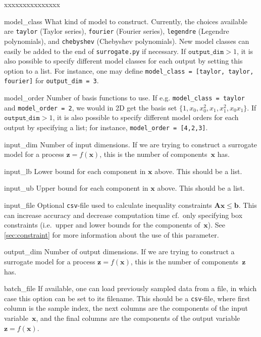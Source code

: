 \documentclass[a4paper,bibliography=numbered]{scrartcl}
\begin{document}
\begin{labeling}{xxxxxxxxxxxxxxx}
	\item[model\_class]
		What kind of model to construct.
		Currently, the choices available are \texttt{taylor} (Taylor series), \texttt{fourier} (Fourier series), \texttt{legendre} (Legendre polynomials), and \texttt{chebyshev} (Chebyshev polynomials).
		New model classes can easily be added to the end of \texttt{surrogate.py} if necessary.
		If $\texttt{output\_dim} > 1$, it is also possible to specify different model classes for each output by setting this option to a list.
		For instance, one may define \texttt{model\_class = [taylor, taylor, fourier]} for \texttt{output\_dim = 3}.
	\item[model\_order]
		Number of basis functions to use.
		If e.g. \texttt{model\_class = taylor} and \texttt{model\_order = 2},
		we would in 2D get the basis set $\{1, x_0, x_0^2, x_1, x_1^2, x_0x_1\}$.
		If $\texttt{output\_dim} > 1$, it is also possible to specify different model orders for each output by specifying a list; for instance, \texttt{model\_order = [4,2,3]}.
	\item[input\_dim]
		Number of input dimensions.
		If we are trying to construct a surrogate model for a process $\bm{z} = f(\bm{x})$, this is the number of components~$\bm{x}$ has.
	\item[input\_lb]
		Lower bound for each component in $\bm{x}$ above. This should be a list.
	\item[input\_ub]
		Upper bound for each component in $\bm{x}$ above. This should be a list.
	\item[input\_file]
		Optional \texttt{csv}-file used to calculate inequality constraints $\bm{A}\bm{x} \leq \bm{b}$.
		This can increase accuracy and decrease computation time cf.\ only specifying box constraints (i.e.\ upper and lower bounds for the components of~$\bm{x}$).
		See \cref{sec:constraint} for more information about the use of this parameter.
	\item[output\_dim]
		Number of output dimensions.
		If we are trying to construct a surrogate model for a process $\bm{z} = f(\bm{x})$, this is the number of components~$\bm{z}$ has.
	\item[batch\_file]
		If available, one can load previously sampled data from a file, in which case this option can be set to its filename.
		This should be a \texttt{csv}-file, where first column is the sample index, the next columns are the components of the input variable~$\bm{x}$, and the final columns are the components of the output variable~$\bm{z} = f(\bm{x})$.

\end{labeling}
\end{document}
